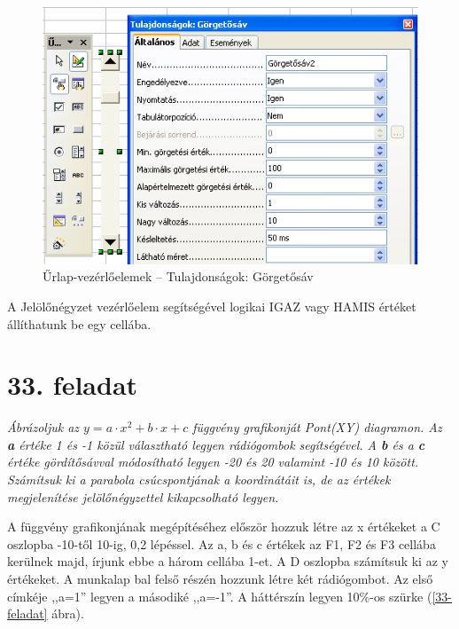 \begin{figure}[!h]
\begin{center}
\includegraphics[width=12.253cm]{oocalcv2-img151.png}
\caption{Űrlap-vezérlőelemek --  Tulajdonságok: Görgetősáv}\label{Görgetősáv}
\end{center}
\end{figure}

A Jelölőnégyzet vezérlőelem segítségével logikai
IGAZ vagy HAMIS értéket állíthatunk be egy cellába.


\section{33. feladat}

{\itshape
Ábrázoljuk az $y=a\cdot x^{2}+b\cdot x+c$ függvény grafikonját
Pont(XY) diagramon. Az \textbf{a} értéke 1 és -1 közül
választható legyen rádiógombok segítségével. A \textbf{b}
és a \textbf{c} értéke gördítősávval módosítható
legyen -20 és 20 valamint -10 és 10 között. Számítsuk ki a
parabola csúcspontjának a koordinátáit is, de az értékek
megjelenítése jelölőnégyzettel kikapcsolható legyen.}

A függvény grafikonjának megépítéséhez először
hozzuk létre az x értékeket a C oszlopba -10-től 10-ig, 0,2
lépéssel. Az a, b és c értékek az F1, F2 és F3 cellába
kerülnek majd, írjunk ebbe a három cellába 1-et. A D oszlopba
számítsuk ki az y értékeket. A munkalap bal felső
részén hozzunk létre két rádiógombot. Az első
címkéje ,,a=1'' legyen a másodiké ,,a=-1''. A
háttérszín legyen 10\%-os szürke (\ref{33-feladat} ábra).

